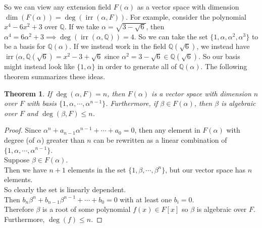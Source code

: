 \documentclass[11pt]{amsart}
\newtheorem{theorem}{Theorem}[section]
\theoremstyle{definition}
\newcommand{\rationals}{\mathbb{Q}}
\DeclareMathOperator{\irr}{irr}
\begin{document}
So we can view any extension field $F(\alpha)$ as a vector space with dimension $\dim(F(\alpha)) = \deg(\irr(\alpha, F))$. For example, consider
the polynomial $x^4 - 6x^2 + 3$ over $\rationals$. If we take $\alpha = \sqrt{3 - \sqrt{6}}$, then 
$\alpha^4 = 6\alpha^2 + 3 \implies \deg(\irr(\alpha, \rationals)) = 4$. So we can take the set $\{ 1, \alpha, \alpha^2, \alpha^3 \}$ to be a basis
for $\rationals(\alpha)$. If we instead work in the field $\rationals(\sqrt{6})$, we instead have $\irr(\alpha, \rationals(\sqrt{6}) = x^2 - 3 + \sqrt{6}$
since $\alpha^2 = 3 - \sqrt{6} \in \rationals(\sqrt{6})$. So our basis might instead look like $\{ 1, \alpha \}$ in order to generate all of 
$\rationals(\alpha)$. The following theorem summarizes these ideas.

\begin{theorem}
	If $\deg(\alpha, F) = n$, then $F(\alpha)$ is a vector space with dimension $n$ over $F$ with basis $\{ 1, \alpha, \cdots, \alpha^{n-1} \}$.
	Furthermore, if $\beta \in F(\alpha)$, then $\beta$ is algebraic over $F$ and $\deg(\beta, F) \leq n$.
\end{theorem}
\begin{proof}
	Since $\alpha^n + a_{n-1}\alpha^{n-1} + \cdots + a_0 = 0$, then any element in $F(\alpha)$ with degree (of $\alpha$) greater than $n$
	can be rewritten as a linear combination of $\{ 1, \alpha, \cdots, \alpha^{n-1} \}$. \\
	Suppose $\beta \in F(\alpha)$. \\
	Then we have $n+1$ elements in the set $\{ 1, \beta, \cdots, \beta^n \}$, but our vector space has $n$ elements. \\
	So clearly the set is linearly dependent. \\
	Then $b_n \beta^n + b_{n-1}\beta^{n-1} + \cdots + b_0 = 0$ with at least one $b_i = 0$. \\
	Therefore $\beta$ is a root of some polynomial $f(x) \in F[x]$ so $\beta$ is algebraic over $F$. \\
	Furthermore, $\deg(f) \leq n$.
\end{proof}

\newpage
\end{document}

